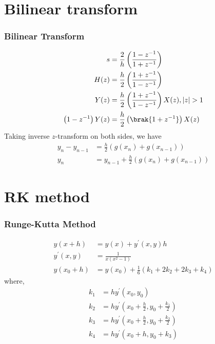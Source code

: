\documentclass{beamer}
\begin{document}
\section{Bilinear transform}
\begin{frame}
\frametitle{Bilinear Transform}
\begin{align}
    s &= \frac{2}{h} \left( {\frac{1 - z^{-1}}{1 + z^{-1}}} \right)  \\
    H(z) &= \frac{h}{2} \left( {\frac{1 + z^{-1}}{1 - z^{-1}}} \right) \\
    Y(z) &= \frac{h}{2} \left( {\frac{1 + z^{-1}}{1 - z^{-1}}} \right) X(z) , |z| > 1\\
    \left( {1 - z^{-1}} \right) Y(z) &= \frac{h}{2} \left( \brak{1 + z^{-1}} \right) X(z) 
\end{align}
Taking inverse \(z\)-transform on both sides, we have
\begin{align}
    y_{n} - y_{n-1} &= \frac{h}{2} \left( {g(x_{n}) + g(x_{n-1})} \right) \\
    y_{n} &= y_{n-1} + \frac{h}{2} \left( {g(x_{n}) + g(x_{n-1})} \right)
\end{align}
\end{frame}

\section{RK method}
\begin{frame}
\frametitle{Runge-Kutta Method}
\begin{align}
    y(x + h) &= y(x) + y^{\prime}(x,y) h \\
    y^{\prime} (x,y) &= \frac{1}{x \left( {x^2 - 1} \right)} \\
    y(x_0 + h) &= y(x_0) + \frac{1}{6} \left( {k_1 + 2k_2 + 2k_3 + k_4} \right)
    \end{align}
where,
\begin{align}
	k_1 &= h y^{\prime} ({x_0, y_0}) \\
	k_2 &= h y^{\prime} ({x_0 + \frac{h}{2}, y_0 + \frac{k_1}{2}}) \\
	k_3 &= h y^{\prime} \left( {x_0 + \frac{h}{2}, y_0 + \frac{k_2}{2}} \right)\\
	k_4 &= h y^{\prime} \left( {x_0 + h, y_0 + k_3} \right)
\end{align}
\end{frame}
\end{document}
